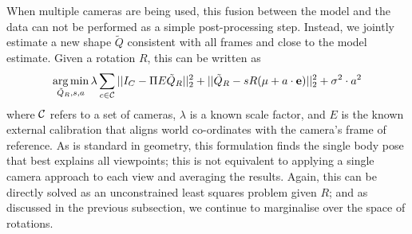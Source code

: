 \documentclass[10pt,twocolumn,letterpaper]{article}
\DeclareMathOperator*{\argmin}{arg\,min}
\newcommand{\rec}{Q}
\begin{document}
When multiple cameras are being used, this fusion between the model and the
data can not be performed as a simple post-processing step. Instead, we jointly
estimate a new shape $\tilde Q$ consistent with all frames and close to the
model estimate.
Given a rotation $R$, this can be written as
\begin{equation}
 \argmin_{\tilde\rec_R,s,a} \lambda\sum_{c\in \cal C}||I_C -\Pi E \tilde\rec_R ||_2^2 + ||\tilde\rec_R - s R (\mu + a \cdot {\bf e})||_2^2 +\sigma^2 \cdot a^2
 \label{eq:shape}
\end{equation}
where $\cal C$ refers to a set of cameras, $\lambda$ is a known scale
factor, and $E$ is the known external calibration that aligns world
co-ordinates with the camera's frame of reference.  As is standard in
geometry, this formulation finds the single body pose that best
explains all viewpoints; this is not equivalent to applying a single
camera approach to each view and averaging the results.
Again, this can be directly solved as an unconstrained least squares problem
given $R$; and as discussed in the previous subsection, we continue to
marginalise over the space of rotations.
\end{document}
